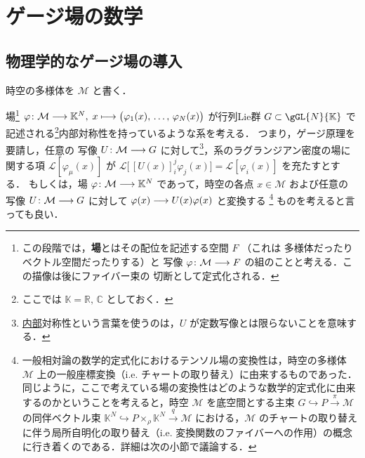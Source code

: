 \documentclass[geometry_main]{subfiles}
\begin{document}
\setcounter{chapter}{9}

\chapter{ゲージ場の数学}
\label{chap10}
\section{物理学的なゲージ場の導入}

時空の多様体を $\mathcal{M}$ と書く．


場\footnote{この段階では，\textbf{場}とはその配位を記述する空間 $F$ （これは \cinfty 多様体だったりベクトル空間だったりする）と \cinfty 写像 $\varphi \colon \mathcal{M} \longrightarrow F$ の組のことと考える．この描像は後にファイバー束の \cinfty 切断として定式化される．} $\varphi \colon \mathcal{M} \longrightarrow \mathbb{K}^N,\; x \longmapsto \bigl(\varphi_1(x),\, \dots,\, \varphi_N(x)\bigr)$ が行列Lie群 $G \subset \gGL{N}{\mathbb{K}}$ で記述される\footnote{ここでは $\mathbb{K} = \mathbb{R},\, \mathbb{C}$ としておく．}内部対称性を持っているような系を考える．
つまり，ゲージ原理を要請し，任意の \cinfty 写像 $U \colon \mathcal{M} \longrightarrow G$ に対して\footnote{\underline{内部}対称性という言葉を使うのは，$U$ が定数写像とは限らないことを意味する．}，系のラグランジアン密度の場に関する項 $\mathcal{L}[\varphi_\mu (x)]$ が $\mathcal{L}\bigl[\, [U(x)]^j_i \varphi_j (x) \bigr] = \mathcal{L}[\varphi_i (x)]$ を充たすとする．
もしくは，場 $\varphi \colon \mathcal{M} \longrightarrow \mathbb{K}^N$ であって，時空の各点 $x \in \mathcal{M}$ および任意の \cinfty 写像 $U \colon \mathcal{M} \longrightarrow G$ に対して $\varphi (x) \longrightarrow U(x) \varphi (x)$ と変換する
\footnote{
    一般相対論の数学的定式化におけるテンソル場の変換性は，時空の多様体 $\mathcal{M}$ 上の一般座標変換（i.e. チャートの取り替え）に由来するものであった．
    同じように，ここで考えている場の変換性はどのような数学的定式化に由来するのかということを考えると，時空 $\mathcal{M}$ を底空間とする主束 $G \hookrightarrow P \xrightarrow{\pi} \mathcal{M}$ の同伴ベクトル束 $\mathbb{K}^N \hookrightarrow P \times_\rho \mathbb{K}^N \xrightarrow{q} \mathcal{M}$ における，$\mathcal{M}$ のチャートの取り替えに伴う局所自明化の取り替え（i.e. 変換関数のファイバーへの作用）の概念に行き着くのである．詳細は次の小節で議論する．
}
ものを考えると言っても良い．
\end{document}
